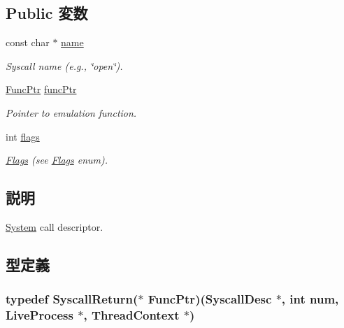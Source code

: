 \subsection*{Public 変数}
\begin{DoxyCompactItemize}
\item 
const char $\ast$ \hyperlink{classSyscallDesc_a8f8f80d37794cde9472343e4487ba3eb}{name}
\begin{DoxyCompactList}\small\item\em Syscall name (e.g., \char`\"{}open\char`\"{}). \item\end{DoxyCompactList}\item 
\hyperlink{classSyscallDesc_a78a0bd5af3c5dd3fcd94f3d629b112ce}{FuncPtr} \hyperlink{classSyscallDesc_ac49878af22e8dd4a329010118f69eafa}{funcPtr}
\begin{DoxyCompactList}\small\item\em Pointer to emulation function. \item\end{DoxyCompactList}\item 
int \hyperlink{classSyscallDesc_ac8bf36fe0577cba66bccda3a6f7e80a4}{flags}
\begin{DoxyCompactList}\small\item\em \hyperlink{classFlags}{Flags} (see \hyperlink{classFlags}{Flags} enum). \item\end{DoxyCompactList}\end{DoxyCompactItemize}


\subsection{説明}
\hyperlink{classSystem}{System} call descriptor. 

\subsection{型定義}
\hypertarget{classSyscallDesc_a78a0bd5af3c5dd3fcd94f3d629b112ce}{
\subsubsection[{FuncPtr}]{\setlength{\rightskip}{0pt plus 5cm}typedef {\bf SyscallReturn}($\ast$ {\bf FuncPtr})({\bf SyscallDesc} $\ast$, int num, {\bf LiveProcess} $\ast$, {\bf ThreadContext} $\ast$)}}
\label{classSyscallDesc_a78a0bd5af3c5dd3fcd94f3d629b112ce}



